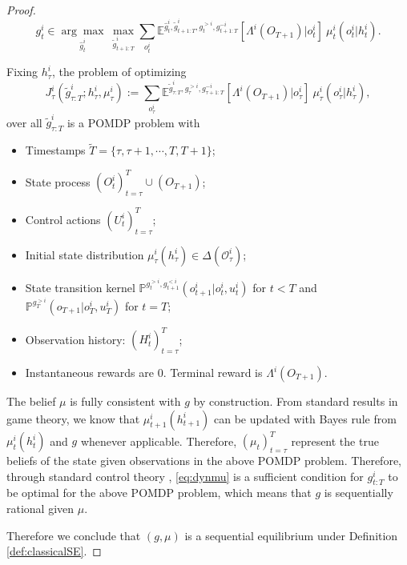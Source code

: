\documentclass[pdflatex,sn-basic]{sn-jnl}
\newcommand{\E}{\mathbb{E}}
\renewcommand{\Pr}{\mathbb{P}}
\theoremstyle{thmstyleone}%
\theoremstyle{thmstyletwo}%
\theoremstyle{thmstylethree}%
\begin{document}
\begin{appendices}
\begin{proof}
        \begin{equation}
			g_{t}^i \in\underset{\hat{g}_t^i}{\arg\max }~\max_{\tilde{g}_{t+1:T}^i} \sum_{o_t^i} \E^{\hat{g}_t^i, \tilde{g}_{t+1:T}^i, g_{t}^{>i}, g_{t+1:T}^{-i}}[\Lambda^i(O_{T+1})|o_t^i]~\mu_t^{i}(o_t^i|h_t^i).\label{eq:dynmu}
		\end{equation}
		
	Fixing $h_\tau^i$, the problem of optimizing 
		\begin{equation}
			J_\tau^i(\tilde{g}_{\tau:T}^i; h_\tau^i, \mu_\tau^i):= \sum_{o_\tau^i} \E^{\tilde{g}_{\tau:T}^i, g_{\tau}^{>i}, g_{\tau+1:T}^{-i}}[\Lambda^i(O_{T+1})|o_\tau^i]~\mu_\tau^{i}(o_\tau^i|h_\tau^i),
		\end{equation}
		over all $\tilde{g}_{\tau:T}^i$ is a POMDP problem with

        \begin{itemize}
			\item \small Timestamps $\tilde{T} = \{\tau, \tau+1, \cdots, T, T+1\}$;
			\item State process $(O_t^i)_{t=\tau}^T\cup (O_{T+1})$;
            \item Control actions $(U_t^i)_{t=\tau}^T$;
			\item Initial state distribution $\mu_\tau^i(h_\tau^i)\in\Delta(\mathcal{O}_{\tau}^i)$;
			\item State transition kernel $\Pr^{g_{t}^{>i}, g_{t+1}^{<i}}(o_{t+1}^i|o_t^i, u_t^i)$ for $t<T$ and $\Pr^{g_{T}^{>i}}(o_{T+1}|o_T^i, u_T^i)$ for $t=T$;
			\item Observation history: $(H_t^i)_{t=\tau}^T$;
			\item Instantaneous rewards are 0. Terminal reward is $\Lambda^i(O_{T+1})$.
		\end{itemize}
 
		The belief $\mu$ is fully consistent with $g$ by construction. From standard results in game theory, we know that $\mu_{t+1}^i(h_{t+1}^i)$ can be updated with Bayes rule from $\mu_{t}^i(h_{t}^i)$ and $g$ whenever applicable. Therefore, $(\mu_t)_{t=\tau}^T$ represent the true beliefs of the state given observations in the above POMDP problem. Therefore, through standard control theory \citep[Section 6.7]{kumar1986stochastic}, \eqref{eq:dynmu} is a sufficient condition for $g_{t:T}^i$ to be optimal for the above POMDP problem, which means that $g$ is sequentially rational given $\mu$.
		
		Therefore we conclude that $(g, \mu)$ is a sequential equilibrium under Definition \ref{def:classicalSE}.
	

\end{proof}
\end{appendices}
\end{document}
